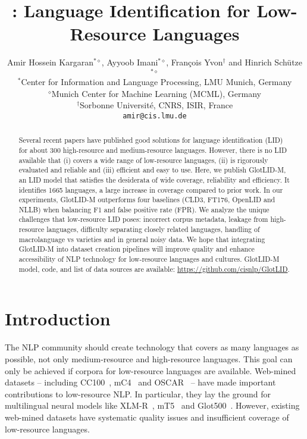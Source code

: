 \documentclass[11pt]{article}
\title{\genericname: Language Identification for
  Low-Resource Languages}
\author{Amir Hossein Kargaran$^{*\diamond}$, Ayyoob Imani$^{*\diamond}$, François Yvon$^{\dag}$ and Hinrich Schütze$^{*\diamond}$ \\
        $^*$Center for Information and Language Processing, LMU Munich, Germany \\
        $^\diamond$Munich Center for Machine Learning (MCML), Germany \\
        $^\dag$Sorbonne Université, CNRS, ISIR, France \protect \\
        \texttt{amir@cis.lmu.de}
}
\def\numberlanguagesaccurate{1665\xspace}
\def\numlangslidcommunity{300\xspace}
\def\modelname{\mbox{GlotLID-M}\xspace}
\def\macrolanguage{macrolanguage\xspace}
\def\ft176{FT176\xspace}
\def\edin{OpenLID\xspace}
\def\nllb{NLLB\xspace}
\begin{document}
\maketitle
\begin{abstract}
Several recent papers have published good solutions for
language identification (LID) for about \numlangslidcommunity high-resource
and medium-resource languages. However, there is no LID
available that (i) covers a wide range of low-resource languages, (ii)
is rigorously evaluated and reliable and (iii) efficient and
easy to use.  Here, we publish \modelname, an LID model that
satisfies the desiderata of wide coverage, reliability and
efficiency.  It identifies \numberlanguagesaccurate
languages, a large increase in coverage compared to prior work. In our experiments, \modelname
outperforms
four baselines (CLD3, \ft176, \edin and \nllb) when
balancing F1 and false positive rate (FPR).
We analyze
the unique challenges that
low-resource LID poses: incorrect corpus metadata, leakage
from high-resource languages, difficulty separating closely
related languages, handling of \macrolanguage vs varieties
and in general noisy data.  We hope that
integrating \modelname into dataset creation pipelines will
improve quality and enhance accessibility of NLP technology
for low-resource languages and cultures. \modelname model, code, and list of data sources are available: \url{https://github.com/cisnlp/GlotLID}.
\end{abstract}



\section{Introduction}
The NLP community should 
create technology that covers as many languages as possible,
not only medium-resource and high-resource languages.  This
goal can only be achieved if corpora for low-resource
languages are available.  Web-mined datasets -- including
CC100~\cite{wenzek-etal-2020-ccnet}, mC4~\cite{xue-etal-2021-mt5}
and OSCAR~\cite{AbadjiOrtizSuarezRomaryetal.2021,
OrtizSuarezSagotRomary2019} -- have made important
contributions to low-resource NLP. In
particular, they lay the ground for multilingual neural
models like XLM-R~\cite{conneau-etal-2020-unsupervised},
mT5~\cite{xue-etal-2021-mt5} and
Glot500~\cite{imanigooghari-etal-2023-glot500}. However, existing
web-mined datasets have systematic quality issues
\citep{kreutzer-etal-2022-quality} and insufficient coverage of
low-resource languages.
\end{document}
